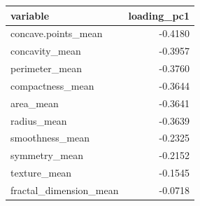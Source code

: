 \begin{tabular}{lr}
\toprule
variable & loading\_pc1 \\
\midrule
concave.points\_mean & -0.4180 \\
concavity\_mean & -0.3957 \\
perimeter\_mean & -0.3760 \\
compactness\_mean & -0.3644 \\
area\_mean & -0.3641 \\
radius\_mean & -0.3639 \\
smoothness\_mean & -0.2325 \\
symmetry\_mean & -0.2152 \\
texture\_mean & -0.1545 \\
fractal\_dimension\_mean & -0.0718 \\
\bottomrule
\end{tabular}

